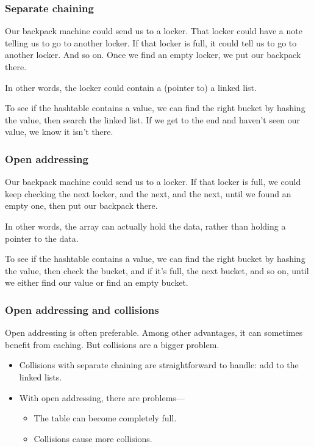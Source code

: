 \documentclass[aspectratio=169]{beamer}
\begin{document}
\begin{frame}
    \frametitle{Separate chaining}

    Our backpack machine could send us to a locker. That locker could have a
    note telling us to go to another locker. If that locker is full, it could
    tell us to go to another locker. And so on. Once we find an empty locker,
    we put our backpack there.


    \vspace{1em}

    In other words, the locker could contain a (pointer to) a linked list.

    \vspace{1em}

    To see if the hashtable contains a value, we can find the right bucket by
    hashing the value, then search the linked list. If we get to the end and
    haven't seen our value, we know it isn't there.
\end{frame}

\begin{frame}
    \frametitle{Open addressing}

    Our backpack machine could send us to a locker. If that locker is full,
    we could keep checking the next locker, and the next, and the next, until
    we found an empty one, then put our backpack there.

    \vspace{1em}

    In other words, the array can actually hold the data, rather than holding
    a pointer to the data.

    \vspace{1em}

    To see if the hashtable contains a value, we can find the right bucket by
    hashing the value, then check the bucket, and if it's full, the next
    bucket, and so on, until we either find our value or find an empty
    bucket.
\end{frame}

\begin{frame}
    \frametitle{Open addressing and collisions}

    Open addressing is often preferable. Among other advantages, it can
    sometimes benefit from caching. But collisions are a bigger problem.

    \vspace{1em}

    \begin{itemize}
        \item Collisions with separate chaining are straightforward to
              handle: add to the linked lists.
        \item With open addressing, there are problems---
        \begin{itemize}
            \item The table can become completely full.
            \item Collisions cause more collisions.
        \end{itemize}
    \end{itemize}
\end{frame}
\end{document}
